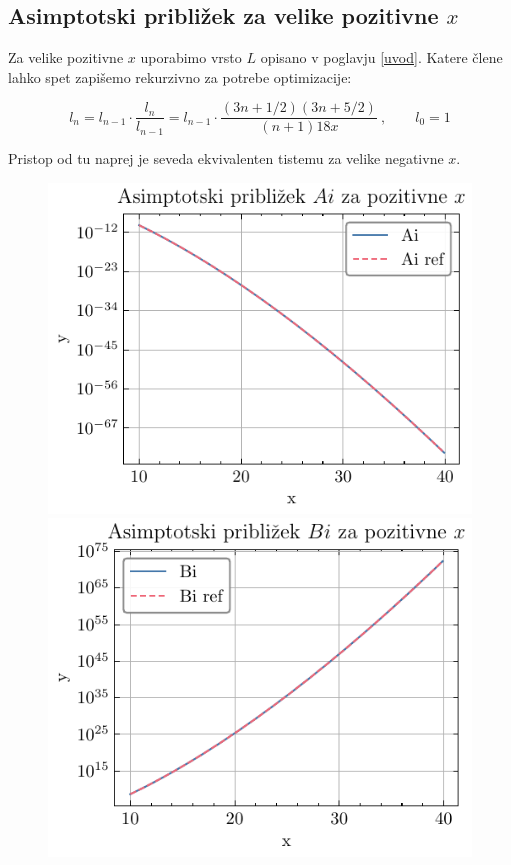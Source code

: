 \documentclass[slovene,11pt,a4paper]{article}
\begin{document}
\newpage
\subsection{Asimptotski približek za velike pozitivne $x$}


Za velike pozitivne $x$ uporabimo vrsto $L$ opisano v poglavju \ref{uvod}. Katere člene lahko spet zapišemo rekurzivno za potrebe optimizacije:

\begin{equation*}
  l_n = l_{n-1} \cdot \frac{l_n}{l_{n-1}} = l_{n-1} \cdot \frac{(3n + 1/2)(3n + 5/2)}{(n + 1)18x} \>, \qquad l_0 = 1
\end{equation*}

Pristop od tu naprej je seveda ekvivalenten tistemu za velike negativne $x$.

\begin{figure}[h]
  \centering
  \begin{minipage}{0.48\textwidth}
    \centering
    \includegraphics[width=\linewidth]{graphs/pos_draw_ai.pdf}
  \end{minipage}\hfill
  \begin{minipage}{0.48\textwidth}
    \centering
    \includegraphics[width=\linewidth]{graphs/pos_draw_bi.pdf}

\end{minipage}
\end{figure}
\end{document}
